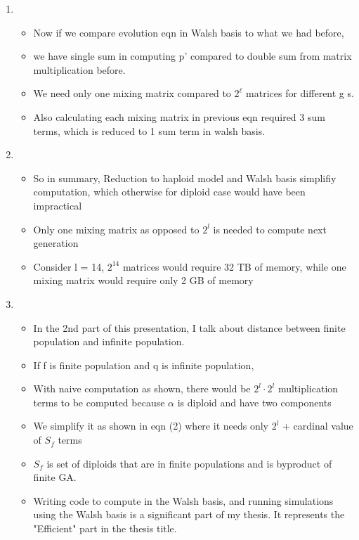 \documentclass{article}
\begin{document}
\begin{enumerate}
\item
  \begin{itemize}
  \item Now if we compare evolution eqn in Walsh basis to what we had before,
  \item we have single sum in computing p' compared to double sum from matrix multiplication before. 
  \item We need only one mixing matrix compared to $2^\ell$ matrices for different g s.
  \item Also calculating each mixing matrix in previous eqn required 3 sum terms, which is reduced to 1 sum term in walsh basis.   
  \end{itemize}
    
\item
  \begin{itemize}
  
  \item So in summary, Reduction to haploid model and Walsh basis simplifiy computation, which otherwise for diploid case would have been impractical
  \item Only one mixing matrix as opposed to $2^l$ is needed to compute next generation
  \item Consider l = 14, $2^{14}$ matrices would require 32 TB of
    memory, while one mixing matrix would require only 2 GB of memory
  
  \end{itemize}
    
\item
  \begin{itemize}
  \item In the 2nd part of this presentation, I talk about distance between finite population and infinite population.
  \item If f is finite population and q is infinite population,
  \item With naive computation as shown, there would
    be $2^l \cdot 2^l$ multiplication terms to be computed because $\alpha$ is diploid and have two components  
  \item We simplify it as shown in eqn (2) where it needs only $2^l$ +
    cardinal value of $S_f$ terms
  \item $S_f$ is set of diploids that are in finite populations and is byproduct of finite GA.
  
  \item Writing code to compute in the Walsh basis, and running simulations using the Walsh basis 
  is a significant part of my thesis. It represents the "Efficient" part in the thesis title.
  \end{itemize}
  

\end{enumerate}
\end{document}

